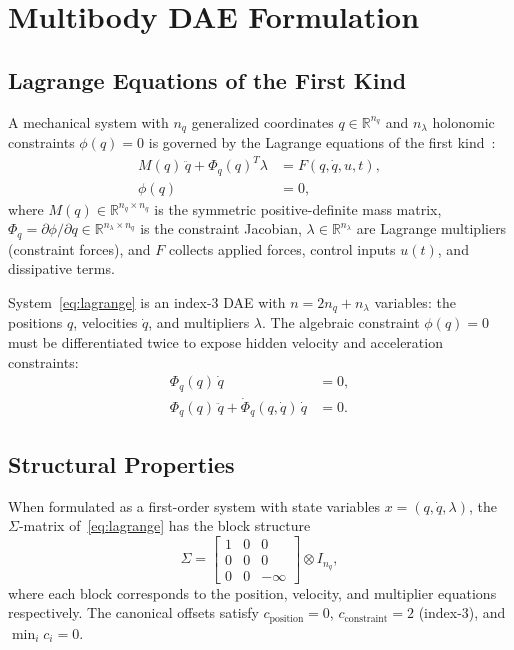 \documentclass[12pt,a4paper]{article}
\theoremstyle{definition}
\theoremstyle{plain}
\begin{document}
\section{Multibody DAE Formulation}
\label{sec:multibody}

\subsection{Lagrange Equations of the First Kind}

A mechanical system with $n_q$ generalized coordinates $q \in \mathbb{R}^{n_q}$ and $n_\lambda$ holonomic constraints $\phi(q) = 0$ is governed by the Lagrange equations of the first kind~\cite{shabana2013dynamics}:
\begin{equation}\label{eq:lagrange}
  \begin{aligned}
    M(q)\,\ddot{q} + \Phi_q(q)^T\lambda &= F(q,\dot{q},u,t),\\
    \phi(q) &= 0,
  \end{aligned}
\end{equation}
where $M(q) \in \mathbb{R}^{n_q \times n_q}$ is the symmetric positive-definite mass matrix, $\Phi_q = \partial\phi/\partial q \in \mathbb{R}^{n_\lambda \times n_q}$ is the constraint Jacobian, $\lambda \in \mathbb{R}^{n_\lambda}$ are Lagrange multipliers (constraint forces), and $F$ collects applied forces, control inputs $u(t)$, and dissipative terms.

System~\eqref{eq:lagrange} is an index-3 DAE with $n = 2n_q + n_\lambda$ variables: the positions $q$, velocities $\dot{q}$, and multipliers $\lambda$. The algebraic constraint $\phi(q)=0$ must be differentiated twice to expose hidden velocity and acceleration constraints:
\begin{align}
  \Phi_q(q)\,\dot{q} &= 0, \label{eq:velcon}\\
  \Phi_q(q)\,\ddot{q} + \dot{\Phi}_q(q,\dot{q})\,\dot{q} &= 0. \label{eq:acccon}
\end{align}

\subsection{Structural Properties}

When formulated as a first-order system with state variables $x = (q,\dot{q},\lambda)$, the $\Sigma$-matrix of~\eqref{eq:lagrange} has the block structure
\begin{equation}\label{eq:multibody_sigma}
  \Sigma =
  \begin{bmatrix}
    1 & 0 & 0 \\
    0 & 0 & 0 \\
    0 & 0 & -\infty
  \end{bmatrix}
  \otimes I_{n_q},
\end{equation}
where each block corresponds to the position, velocity, and multiplier equations respectively. The canonical offsets satisfy $c_{\text{position}} = 0$, $c_{\text{constraint}} = 2$ (index-3), and $\min_i c_i = 0$.
\end{document}
